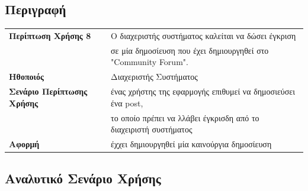 \documentclass{article}
\newcommand\T{\rule{0pt}{2.6ex}}       %
\newcommand\B{\rule[-1.2ex]{0pt}{0pt}}
\begin{document}
\subsection{Περιγραφή}

\begin{center}
     \begin{tabular}{|l|l|}
     \hline
      \textbf{Περίπτωση Χρήσης 8} & Ο διαχεριστής συστήματος καλείται να δώσει έγκριση \T \\& σε μία δημοσίευση που έχει δημιουργηθεί στο "Community Forum". \B \\ 
      \hline
      \textbf{Ηθοποιός} & Διαχεριστής Συστήματος\T\B \\
      \hline
      \textbf{Σενάριο Περίπτωσης Χρήσης} & ένας χρήστης της εφαρμογής επιθυμεί να δημοσιεύσει ένα post, \T \\&  το οποίο πρέπει να λλάβει έγκρισδη από το διαχειριστή συστήματος\B \\
      \hline
      \textbf{Αφορμή} &  έχχει δημιουργηθεί μία καινούργια δημοσίευση\T\B \\
      \hline
     \end{tabular}
 \end{center}
 
 \subsection{ Αναλυτικό Σενάριο Χρήσης}
 
\end{document}
